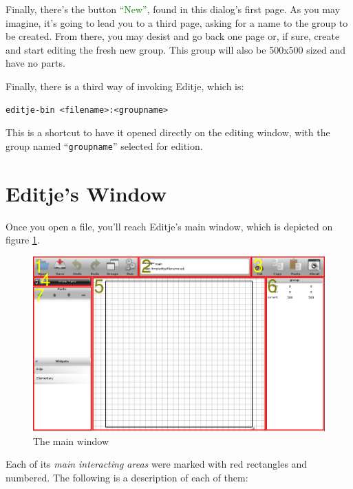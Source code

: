 \documentclass[a4paper]{profusion}
\newcommand{\GUIButton}[1]{\textcolor{green}{#1}} %
\begin{document}
Finally, there's the button \GUIButton{``New''}, found in this
dialog's first page. As you may imagine, it's going to lead you to a
third page, asking for a name to the group to be created. From there,
you may desist and go back one page or, if sure, create and start
editing the fresh new group. This group will also be 500x500 sized and
have no parts.

Finally, there is a third way of invoking Editje, which is:

\begin{verbatim}
editje-bin <filename>:<groupname>
\end{verbatim}

This is a shortcut to have it opened directly on the editing window,
with the group named ``\texttt{groupname}'' selected for edition.

\section{Editje's Window}

Once you open a file, you'll reach Editje's main window, which is
depicted on figure \ref{fig:main_window}.

\begin{figure}[h!]
  \centering
  \includegraphics[width=1.0\textwidth]{images/main_window.png}
  \caption{The main window}
  \label{fig:main_window}
\end{figure}

Each of its \emph{main interacting areas} were marked with red
rectangles and numbered. The following is a description of each of
them:
\end{document}
